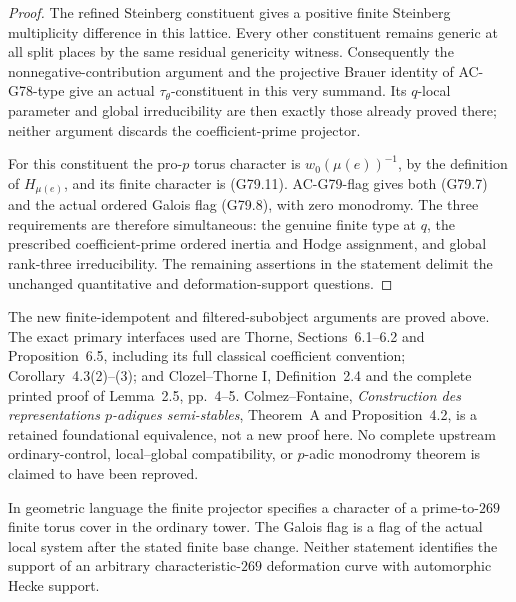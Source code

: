 \begin{proof}
The refined Steinberg constituent gives a positive
finite Steinberg multiplicity difference in this
lattice.  Every other constituent remains generic at
all split places by the same residual genericity witness.
Consequently the nonnegative-contribution argument and
the projective Brauer identity of AC-G78-type give an
actual \(\tau_\theta\)-constituent in this very summand.
Its \(q\)-local parameter and global irreducibility are
then exactly those already proved there; neither
argument discards the coefficient-prime projector.

For this constituent the pro-\(p\) torus character is
\(w_0(\mu(e))^{-1}\), by the definition of
\(H_{\mu(e)}\), and its finite character is (G79.11).
AC-G79-flag gives both (G79.7) and the actual ordered
Galois flag (G79.8), with zero monodromy.
The three requirements are therefore simultaneous:
the genuine finite type at \(q\), the prescribed
coefficient-prime ordered inertia and Hodge assignment,
and global rank-three irreducibility.
The remaining assertions in the statement delimit the
unchanged quantitative and deformation-support questions.
\end{proof}

\begin{remark}
The new finite-idempotent and filtered-subobject arguments
are proved above.  The exact primary interfaces used are
Thorne, Sections~6.1--6.2 and Proposition~6.5, including
its full classical coefficient convention; Corollary~4.3(2)--(3);
and Clozel--Thorne I, Definition~2.4 and the complete
printed proof of Lemma~2.5, pp.~4--5.
Colmez--Fontaine, \emph{Construction des representations
\(p\)-adiques semi-stables}, Theorem~A and Proposition~4.2, is a retained
foundational equivalence, not a new proof here.
No complete upstream ordinary-control, local--global
compatibility, or \(p\)-adic monodromy theorem is claimed
to have been reproved.

In geometric language the finite projector specifies a
character of a prime-to-\(269\) finite torus cover in the
ordinary tower.  The Galois flag is a flag of the actual
local system after the stated finite base change.
Neither statement identifies the support of an arbitrary
characteristic-\(269\) deformation curve with automorphic
Hecke support.
\end{remark}
